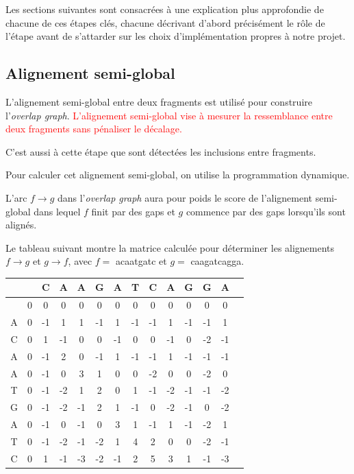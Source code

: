 \documentclass{article}
\begin{document}
Les sections suivantes sont consacrées à une explication plus approfondie de chacune de ces étapes clés, chacune décrivant d'abord précisément le rôle de l'étape avant de s'attarder sur les choix d'implémentation propres à notre projet.

\subsection{Alignement semi-global}

L'alignement semi-global entre deux fragments est utilisé pour construire l'\textit{overlap graph}. \textcolor{red}{L'alignement semi-global vise à mesurer la ressemblance entre deux fragments sans pénaliser le décalage.} 

C'est aussi à cette étape que sont détectées les inclusions entre fragments.

Pour calculer cet alignement semi-global, on utilise la programmation dynamique.


L'arc $f \to g$ dans l'\textit{overlap graph} aura pour poids le score de l'alignement semi-global dans lequel $f$ finit par des gaps et $g$ commence par des gaps lorsqu'ils sont alignés.

Le tableau suivant montre la matrice calculée pour déterminer les alignements $f \to g$ et $g \to f$, avec $f =$ acaatgatc et $g =$ caagatcagga.

\begin{table}[h]
	\centering
	\begin{tabular}{|c|c|c|c|c|c|c|c|c|c|c|c|c|c|}
		\hline
		&& C & A & A & G & A & T & C & A & G & G & A\\		
		\hline
		& 0 & 0 & 0 & 0 & 0 & 0 & 0 & 0 & 0 & 0 & \cellcolor{lightgreen}0 & 0  \\
		\hline 
		A&\cellcolor{lightred}0 & -1 & 1 & 1 & -1 & 1 & -1 & -1 & 1 & -1 & -1 &\cellcolor{lightgreen}1 \\
		\hline 
		C&0 & \cellcolor{lightred}1 & -1 & 0 & 0 & -1 & 0 & 0 & -1 & 0 & -2 & -1 \\
		\hline 
		A&0 & -1 & \cellcolor{lightred}2 & 0 & -1 & 1 & -1 & -1 & 1 & -1 & -1 & -1  \\
		\hline 
		A&0 & -1 & 0 & \cellcolor{lightred}3 & 1 & 0 & 0 & -2 & 0 & 0 & -2 & 0 \\
		\hline 
		T&0 & -1 & -2 & \cellcolor{lightred}1 & 2 & 0 & 1 & -1 & -2 & -1 & -1 & -2  \\
		\hline 
		G&0 & -1 & -2 & -1 & \cellcolor{lightred}2 & 1 & -1 & 0 & -2 & -1 & 0 & -2  \\
		\hline 
		A&0 & -1 & 0 & -1 & 0 & \cellcolor{lightred}3 & 1 & -1 & 1 & -1 & -2 & 1  \\
		\hline 
		T&0 & -1 & -2 & -1 & -2 & 1 & \cellcolor{lightred}4 & 2 & 0 & 0 & -2 & -1  \\
		\hline 
		C&0 & 1 & -1 & -3 & -2 & -1 & 2 & \cellcolor{lightred}5 & 3 & 1 & -1 & -3  \\
		\hline 
	\end{tabular}
\end{table}
\end{document}
